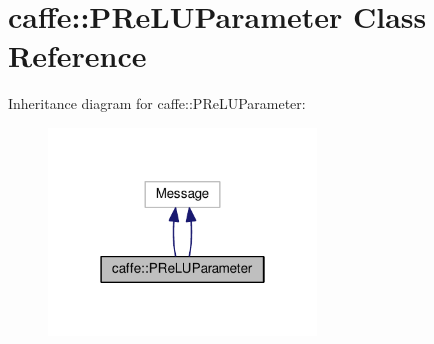 \hypertarget{classcaffe_1_1_p_re_l_u_parameter}{}\section{caffe\+:\+:P\+Re\+L\+U\+Parameter Class Reference}
\label{classcaffe_1_1_p_re_l_u_parameter}


Inheritance diagram for caffe\+:\+:P\+Re\+L\+U\+Parameter\+:
\nopagebreak
\begin{figure}[H]
\begin{center}
\leavevmode
\includegraphics[width=202pt]{classcaffe_1_1_p_re_l_u_parameter__inherit__graph}
\end{center}
\end{figure}
